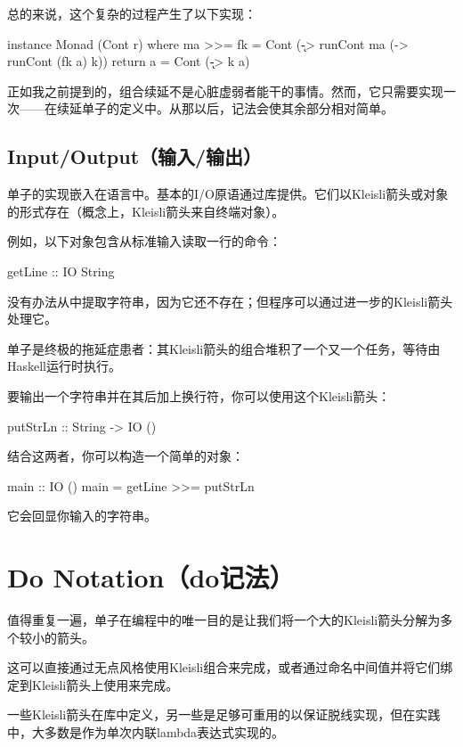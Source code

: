 \documentclass[DaoFP]{subfiles}
\begin{document}
    总的来说，这个复杂的过程产生了以下实现：
    \begin{haskell}
        instance Monad (Cont r) where
        ma >>= fk = Cont (\k -> runCont ma (\a -> runCont (fk a) k))
        return a = Cont (\k -> k a)
    \end{haskell}
    正如我之前提到的，组合续延不是心脏虚弱者能干的事情。然而，它只需要实现一次——在续延单子的定义中。从那以后，记法会使其余部分相对简单。

    \subsection{Input/Output（输入/输出）}

    单子的实现嵌入在语言中。基本的I/O原语通过库提供。它们以Kleisli箭头或对象的形式存在（概念上，Kleisli箭头来自终端对象\hask{()}）。

    例如，以下对象包含从标准输入读取一行的命令：
    \begin{haskell}
        getLine :: IO String
    \end{haskell}
    没有办法从中提取字符串，因为它还不存在；但程序可以通过进一步的Kleisli箭头处理它。

    单子是终极的拖延症患者：其Kleisli箭头的组合堆积了一个又一个任务，等待由Haskell运行时执行。

    要输出一个字符串并在其后加上换行符，你可以使用这个Kleisli箭头：
    \begin{haskell}
        putStrLn :: String -> IO ()
    \end{haskell}
    结合这两者，你可以构造一个简单的对象：
    \begin{haskell}
        main :: IO ()
        main = getLine >>= putStrLn
    \end{haskell}
    它会回显你输入的字符串。

    \section{Do Notation（do记法）}

    值得重复一遍，单子在编程中的唯一目的是让我们将一个大的Kleisli箭头分解为多个较小的箭头。

    这可以直接通过无点风格使用Kleisli组合\hask{<=<}来完成，或者通过命名中间值并将它们绑定到Kleisli箭头上使用\hask{>>=}来完成。

    一些Kleisli箭头在库中定义，另一些是足够可重用的以保证脱线实现，但在实践中，大多数是作为单次内联lambda表达式实现的。
\end{document}
